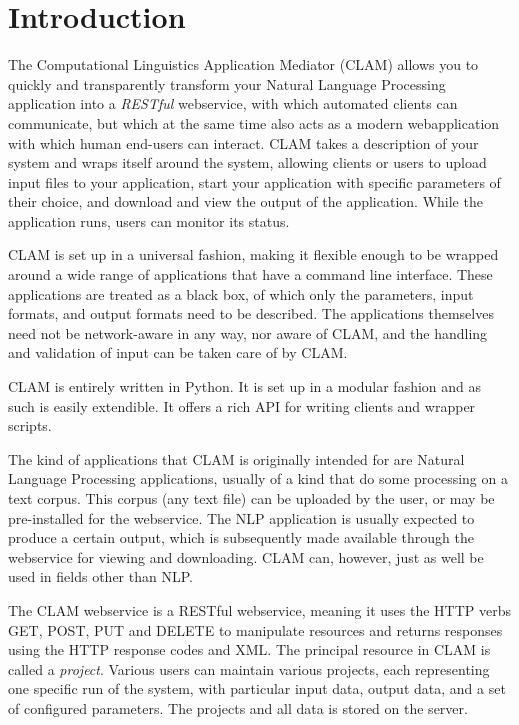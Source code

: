 \documentclass[a4paper,12pt,twoside,openright]{report}
\begin{document}
\chapter{Introduction} 

The Computational Linguistics Application Mediator (CLAM) allows you to quickly
and transparently transform your Natural Language Processing application into a
\emph{RESTful}\/ webservice, with which automated clients can communicate, but
which at the same time also acts as a modern webapplication with which human
end-users can interact. CLAM takes a description of your system and wraps
itself around the system, allowing clients or users to upload input files to
your application, start your application with specific parameters of their
choice, and download and view the output of the application. While the
application runs, users can monitor its status.

CLAM is set up in a universal fashion, making it flexible enough to be wrapped
around a wide range of applications that have a command line interface. These
applications are treated as a black box, of which only the parameters, input
formats, and output formats need to be described. The applications themselves
need not be network-aware in any way, nor aware of CLAM, and the handling and
validation of input can be taken care of by CLAM.

CLAM is entirely written in Python. It is set up in a modular fashion and as
such is easily extendible. It offers a rich API for writing clients and wrapper
scripts.

The kind of applications that CLAM is originally intended for are Natural Language
Processing applications, usually of a kind that do some processing on a text
corpus. This corpus (any text file) can be uploaded by the user, or may be
pre-installed for the webservice. The NLP application is usually expected to
produce a certain output, which is subsequently made available through the
webservice for viewing and downloading. CLAM can, however, just as well be used
in fields other than NLP.

The CLAM webservice is a RESTful webservice\citep{REST}, meaning it uses the HTTP verbs
GET, POST, PUT and DELETE to manipulate resources and returns responses using
the HTTP response codes and XML. The principal resource in CLAM is called a
\emph{project}. Various users can maintain various projects, each representing
one specific run of the system, with particular input data, output data, and a
set of configured parameters. The projects and all data is stored on the
server.
\end{document}
